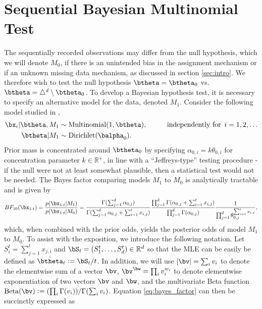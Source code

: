 \documentclass[11pt]{article}
\newcommand{\Reals}{\mathbb R}
\newcommand{\Beta}{\mathrm{Beta}}
\newcommand{\df}{\vcentcolon=}
\begin{document}
\section{Sequential Bayesian Multinomial Test}
\label{sec:srm_testing}
The sequentially recorded observations may differ from the null hypothesis, which we will denote $M_0$, if there is an unintended bias in the assignment mechanism or if an unknown missing data mechanism, as discussed in section \ref{sec:intro}.
We therefore wish to test the null hypothesis $\btheta = \btheta_0$ vs.\ $\btheta = \triangle^d \setminus \btheta_0$.
To develop a Bayesian hypothesis test, it is necessary to specify an alternative model for the data, denoted $M_1$.
Consider the following model studied in \cite{good},
\begin{align}
    \bx_i | \btheta, M_1 &\sim \text{Multinomial}(1,\btheta), \hspace{1cm} \text{independently for }\, i=1,2,\dots\\
  \btheta | M_1 &\sim \text{Dirichlet}(\balpha_0).\notag
\end{align}
Prior mass is concentrated around $\btheta_0$ by specifying $\alpha_{0,i} = k \theta_{0,i}$ for concentration parameter $k \in \mathbb{R}^+$, in line with a ``Jeffreys-type'' testing procedure - if the null were not at least somewhat plausible, then a statistical test would not be needed.
The Bayes factor comparing models $M_1$ to $M_0$ is analytically tractable and is given by
\begin{equation}
  \label{eq:bayes_factor}
 BF_{10}(\bx_{1:t}) = \frac{p(\bx_{1:t}|M_1)}{p(\bx_{1:t}|M_0)} = \frac{\Gamma(\sum_{j=1}^{d} \alpha_{0,j})}{\Gamma(\sum_{j=1}^{d} \alpha_{0,j} + \sum_{i=1}^{t}x_{i,j})}\frac{\prod_{j=1}^{d}\Gamma(\alpha_{0,j} + \sum_{i=1}^{t}x_{i,j} )}{\prod_{j=1}^{d}\Gamma(\alpha_{0,j} )}\frac{1}{\prod_{j=1}^{d} \theta_{0,j}^{\sum_{i=1}^{t}x_{i,j}}},
\end{equation}
which, when combined with the prior odds, yields the posterior odds of model $M_1$ to $M_0$.
To assist with the exposition, we introduce the following notation. 
Let $S_i^t=\sum_{j=1}^{t}x_{j,i}$ and $\bS_t=(S_1^t,\ldots, S_d^t)\in\Reals^d$
so that the MLE can be easily be defined as $\hat \btheta_t \df \bS_t/t$.
In addition, we will use $|\bv| = \sum_{i} v_i$ to denote the elementwise sum of a vector $\bv$, 
$\bv^{\bw} = \prod_{i} v_{i}^{w_i}$ to denote elementwise exponentiation of two vectors $\bv$ and $\bw$,
and the multivariate Beta function $\Beta(\bv) \df (\prod_{i}\Gamma(v_i))/\Gamma(\sum_i v_i)$. 
Equation \eqref{eq:bayes_factor} can then be succinctly expressed as 
\end{document}
